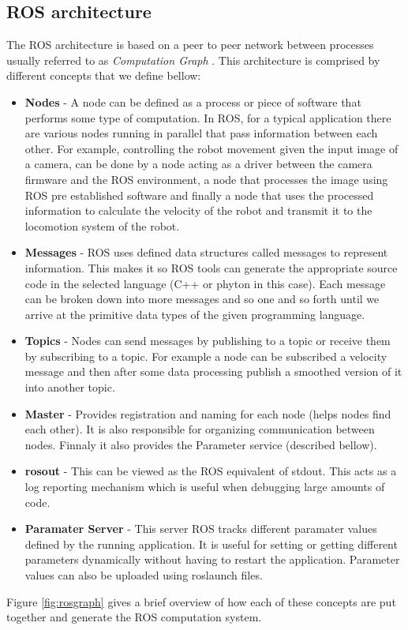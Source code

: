 \subsection{ROS architecture}
The \ac{ROS}  architecture is based on a peer to peer network between processes usually referred to as \textit{Computation Graph} \cite{packt}. This architecture is comprised by different concepts that we define bellow:
\begin{itemize}
\item \textbf{Nodes} - A node can be defined as a process or piece of software  that performs some type of computation. In \ac{ROS}, for a typical application there are various nodes running in parallel that pass information between each other. For example,  controlling the robot movement given the input image of a camera, can be done by a node acting as a driver between the camera firmware and the ROS environment, a node that processes the image  using ROS pre established software and finally a node that uses the processed information to calculate the velocity of the robot and transmit it to  the locomotion system of the robot. 
\item \textbf{Messages} - \ac{ROS} uses defined data structures  called messages to represent information. This makes it so \ac{ROS} tools can generate the appropriate source code in the selected language (C++ or phyton in this case). Each message can be broken down into more messages and so one and so forth until we arrive at the primitive data types of the given programming language. 
\item \textbf{Topics} - 
Nodes can send messages by publishing to a topic or receive them by subscribing to a topic. For example a node can be subscribed a velocity message and then after some data processing publish a smoothed version of it into another topic.  
\item \textbf{Master} - Provides registration and naming for each node (helps nodes find each other). It is also responsible for organizing communication between nodes. Finnaly it also provides the Parameter service (described bellow).
\item \textbf{rosout} - This can be viewed as the ROS equivalent of stdout. This acts as a log reporting mechanism which is useful when debugging large amounts of code.
\item \textbf{Paramater Server} - This server \ac{ROS} tracks different paramater values defined by the running application. It is useful for setting or getting different parameters dynamically without having to restart the application. Parameter values can also be uploaded using roslaunch files.

\end{itemize}
Figure \ref{fig:rosgraph} gives a brief overview of how each of these concepts are put together and  generate the ROS  computation system.

